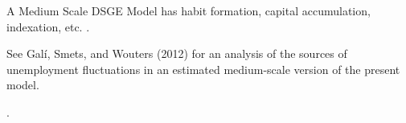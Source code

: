 \documentclass[../thesis.tex]{subfiles}
\begin{document}
\begin{comment}
	
	\begin{definition}[Canonical NK Model]
		
		\cite[Lecture 13, p.7]{solis-garcia_ucb_2022}
		
		3.1.2 Back to the pricing equation:
		
		log-linearize the left hand equation:
		\begin{align*}
			&\mathbb{E}_t \sum_{s=0}^{\infty} 
			\left[ 
			\left( \frac{\theta}{1+R} \right)^s
			\left( \frac{P_t^\ast Y_{t+s}(j)}{1 + \frac{1}{1+R}
				\sum_{k=0}^{s-1} \widetilde{R}_{t+k}} \right) 
			\right]
			\implies \\
			&\mathbb{E}_t \sum_{s=0}^{\infty} 
			\left[ 
			\left( \frac{\theta}{1+R} \right)^s
			\left( \frac{P^\ast Y(j)(1+\widehat{P}_t^\ast + \widehat{Y}_{t+s}(j))}{1 + \frac{1}{1+R}
				\sum_{k=0}^{s-1} \widetilde{R}_{t+k}} \right) 
			\right] \implies \\
			&\mathbb{E}_t \sum_{s=0}^{\infty} 
			\left[ 
			\left( \frac{\theta}{1+R} \right)^s
			\left( \frac{P_t^\ast Y_{t+s}(j)}{\frac{(1+R)+\sum_{k=0}^{s-1} \widetilde{R}_{t+k}}{1+R}} \right) 
			\right]
			\implies \\
			&\mathbb{E}_t \sum_{s=0}^{\infty} 
			\left[ 
			\left( \frac{\theta}{1+R} \right)^s
			\left( \frac{P_t^\ast Y_{t+s}(j)(1+R)}{(1+R)+\sum_{k=0}^{s-1} \widetilde{R}_{t+k}} \right) 
			\right]
			\implies \\
			&\mathbb{E}_t \sum_{s=0}^{\infty} 
			\left[ 
			\left( \frac{\theta}{1+R} \right)^s
			\left( \frac{P^\ast Y(j)(1+\widehat{P}_t^\ast + \widehat{Y}_{t+s}(j))(1+R)}{(1+R)+\sum_{k=0}^{s-1} \widetilde{R}_{t+k}} \right) 
			\right]
		\end{align*}
		
	\end{definition}
	
\end{comment}

\begin{definition}
	A Medium Scale DSGE Model has habit formation, capital accumulation, indexation, etc. \cite[p.208]{gali_monetary_2015}. 
	
	See Galí, Smets, and Wouters (2012) for an analysis of the sources of unemployment fluctuations in an estimated medium-scale version of the present model.
\end{definition}

\begin{definition}
	\cite[Lecture 5, p.3]{solis-garcia_ucb_2022}.
\end{definition}
\end{document}
